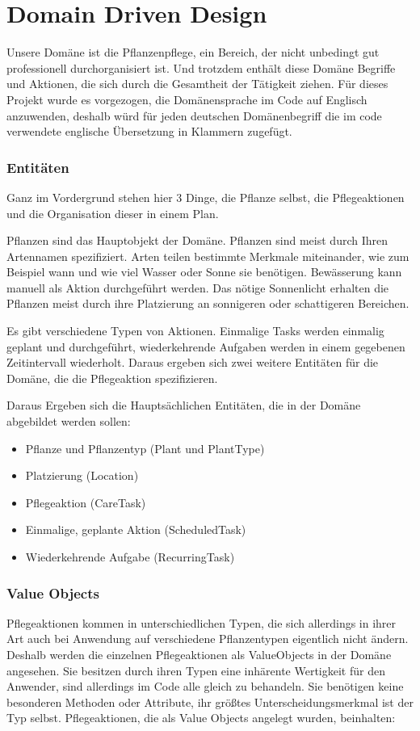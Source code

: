 \chapter{Domain Driven Design}
Unsere Domäne ist die Pflanzenpflege, ein Bereich, der nicht unbedingt gut professionell durchorganisiert ist. Und trotzdem enthält diese Domäne Begriffe und Aktionen, die sich durch die Gesamtheit der Tätigkeit ziehen. Für dieses Projekt wurde es vorgezogen, die Domänensprache im Code auf Englisch anzuwenden, deshalb würd für jeden deutschen Domänenbegriff die im code verwendete englische Übersetzung in Klammern zugefügt.

\subsection*{Entitäten}
Ganz im Vordergrund stehen hier 3 Dinge, die Pflanze selbst, die Pflegeaktionen und die Organisation dieser in einem Plan.
\par
Pflanzen sind das Hauptobjekt der Domäne. Pflanzen sind meist durch Ihren Artennamen spezifiziert. Arten teilen bestimmte Merkmale miteinander, wie zum Beispiel wann und wie viel Wasser oder Sonne sie benötigen. Bewässerung kann manuell als Aktion durchgeführt werden.  Das nötige Sonnenlicht erhalten die Pflanzen meist durch ihre Platzierung an sonnigeren oder schattigeren Bereichen. 
\par
Es gibt verschiedene Typen von Aktionen. Einmalige Tasks werden einmalig geplant und durchgeführt, wiederkehrende Aufgaben werden in einem gegebenen Zeitintervall wiederholt. Daraus ergeben sich zwei weitere Entitäten für die Domäne, die die Pflegeaktion spezifizieren.
\par
Daraus Ergeben sich die Hauptsächlichen Entitäten, die in der Domäne abgebildet werden sollen:

\begin{itemize}
	\item Pflanze und Pflanzentyp (Plant und PlantType)
	\item Platzierung (Location)
	\item Pflegeaktion (CareTask)
	\item Einmalige, geplante Aktion (ScheduledTask)
	\item Wiederkehrende Aufgabe (RecurringTask)
\end{itemize}

\subsection*{Value Objects}
Pflegeaktionen kommen in unterschiedlichen Typen, die sich allerdings in ihrer Art auch bei Anwendung auf verschiedene Pflanzentypen eigentlich nicht ändern. Deshalb werden die einzelnen Pflegeaktionen als ValueObjects in der Domäne angesehen. Sie besitzen durch ihren Typen eine inhärente Wertigkeit für den Anwender, sind allerdings im Code alle gleich zu behandeln.  Sie benötigen keine besonderen Methoden oder Attribute, ihr größtes Unterscheidungsmerkmal ist der Typ selbst. Pflegeaktionen, die als Value Objects angelegt wurden, beinhalten:


